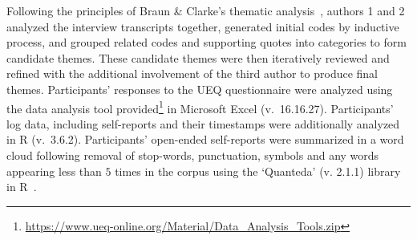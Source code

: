         Following the principles of Braun \& Clarke's thematic analysis~\cite{braun2006using, blandford2013semi}, authors 1 and 2 analyzed the interview transcripts together, generated initial codes by inductive process, and grouped related codes and supporting quotes into categories to form candidate themes. These candidate themes were then iteratively reviewed and refined with the additional involvement of the third author to produce final themes. Participants' responses to the \ac{UEQ} questionnaire were analyzed using the data analysis tool provided\footnote{\url{https://www.ueq-online.org/Material/Data_Analysis_Tools.zip}} in Microsoft Excel (v.~16.16.27). Participants' log data, including self-reports and their timestamps were additionally analyzed in R (v.~3.6.2). Participants' open-ended self-reports were summarized in a word cloud following removal of stop-words, punctuation, symbols and any words appearing less than $5$ times in the corpus using the `Quanteda' (v. 2.1.1) library in R~\cite{Benoit2018}.


